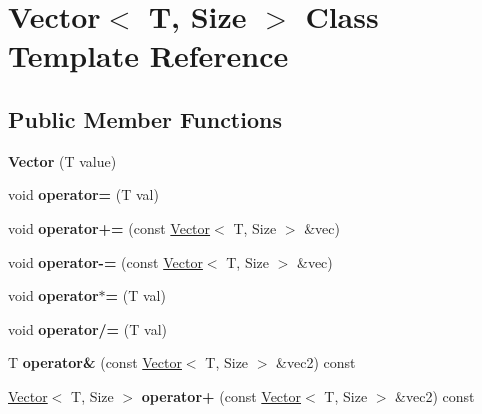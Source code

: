 \hypertarget{class_vector}{}\section{Vector$<$ T, Size $>$ Class Template Reference}
\label{class_vector}
\subsection*{Public Member Functions}
\begin{DoxyCompactItemize}
\item 
\mbox{\label{class_vector_a5f5f513efb40cac258906e772122ef85}} 
{\bfseries Vector} (T value)
\item 
\mbox{\label{class_vector_ab6d90209f09c5c08d1665a0b2a0166d9}} 
void {\bfseries operator=} (T val)
\item 
\mbox{\label{class_vector_a180985d204f16d4c5e2d46586777a473}} 
void {\bfseries operator+=} (const \hyperlink{class_vector}{Vector}$<$ T, Size $>$ \&vec)
\item 
\mbox{\label{class_vector_aa00deb2afad52411d3bf53ee0f8d73f4}} 
void {\bfseries operator-\/=} (const \hyperlink{class_vector}{Vector}$<$ T, Size $>$ \&vec)
\item 
\mbox{\label{class_vector_a6f97334fb23e9b13fe2c258f05674a80}} 
void {\bfseries operator$\ast$=} (T val)
\item 
\mbox{\label{class_vector_abfab5a37b726897929d22b81288eb23a}} 
void {\bfseries operator/=} (T val)
\item 
\mbox{\label{class_vector_a33eff9ad272e1efb48a205d02f205352}} 
T {\bfseries operator\&} (const \hyperlink{class_vector}{Vector}$<$ T, Size $>$ \&vec2) const
\item 
\mbox{\label{class_vector_a233a2a273cda490bf744cf570f7d7b5e}} 
\hyperlink{class_vector}{Vector}$<$ T, Size $>$ {\bfseries operator+} (const \hyperlink{class_vector}{Vector}$<$ T, Size $>$ \&vec2) const
\item 
\mbox{\label{class_vector_a425d5e1ae5fcfe9a95d7570464b19257}} 

\end{DoxyCompactItemize}
